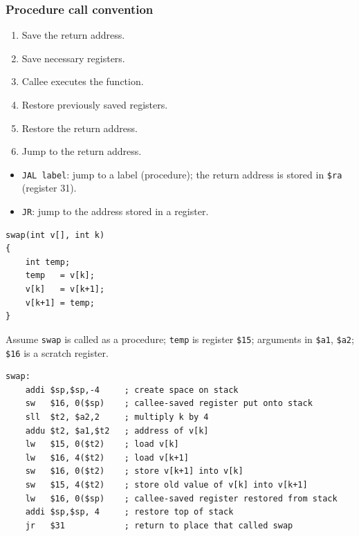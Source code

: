 \subsubsection{Procedure call convention}

\begin{definition}
\leavevmode
\begin{enumerate}
  \item Save the return address.
  \item Save necessary registers.
  \item Callee executes the function.
  \item Restore previously saved registers.
  \item Restore the return address.
  \item Jump to the return address.
\end{enumerate}
\end{definition}
\begin{itemize}
  \item \texttt{JAL label}: jump to a label (procedure); the return address
  is stored in \texttt{\$ra} (register 31).
  \item \texttt{JR}: jump to the address stored in a register.
\end{itemize}

\begin{eg}
\leavevmode
\begin{lstlisting}
swap(int v[], int k)
{
    int temp;
    temp   = v[k];
    v[k]   = v[k+1];
    v[k+1] = temp;
}
\end{lstlisting}
Assume \texttt{swap} is called as a procedure; \texttt{temp} is register
\texttt{\$15}; arguments in \texttt{\$a1}, \texttt{\$a2}; \texttt{\$16} is a
scratch register.

\begin{lstlisting}
swap:
    addi $sp,$sp,-4     ; create space on stack
    sw   $16, 0($sp)    ; callee-saved register put onto stack
    sll  $t2, $a2,2     ; multiply k by 4
    addu $t2, $a1,$t2   ; address of v[k]
    lw   $15, 0($t2)    ; load v[k]
    lw   $16, 4($t2)    ; load v[k+1]
    sw   $16, 0($t2)    ; store v[k+1] into v[k]
    sw   $15, 4($t2)    ; store old value of v[k] into v[k+1]
    lw   $16, 0($sp)    ; callee-saved register restored from stack
    addi $sp,$sp, 4     ; restore top of stack
    jr   $31            ; return to place that called swap
\end{lstlisting}
\end{eg}

